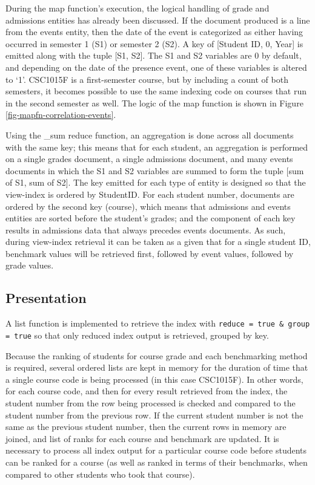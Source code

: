 During the map function’s execution, the logical handling of grade and admissions entities has already been discussed. If the document produced is a line from the events entity, then the date of the event is categorized as either having occurred in semester 1 (S1) or semester 2 (S2). A key of [Student ID, 0, Year] is emitted along with the tuple [S1, S2]. The S1 and S2 variables are 0 by default, and depending on the date of the presence event, one of these variables is altered to `1'. CSC1015F is a first-semester course, but by including a count of both semesters, it becomes possible to use the same indexing code on courses that run in the second semester as well. The logic of the map function is shown in Figure \ref{fig-mapfn-correlation-events}.

Using the \_sum reduce function, an aggregation is done across all documents with the same key; this means that for each student, an aggregation is performed on a single grades document, a single admissions document, and many events documents in which the S1 and S2 variables are summed to form the tuple [sum of S1, sum of S2]. The key emitted for each type of entity is designed so that the view-index is ordered by StudentID. For each student number, documents are ordered by the second key (course), which means that admissions and events entities are sorted before the student’s grades; and the  component of each key results in admissions data that always precedes events documents. As such, during view-index retrieval it can be taken as a given that for a single student ID, benchmark values will be retrieved first, followed by event values, followed by grade values.



\subsection{Presentation}
A list function is implemented to retrieve the index with \texttt{reduce = true \& group = true} so that only reduced index output is retrieved, grouped by key.

Because the ranking of students for course grade and each benchmarking method is required, several ordered lists are kept in memory for the duration of time that a single course code is being processed (in this case CSC1015F). In other words, for each course code, and then for every result retrieved from the index, the student number from the row being processed is checked and compared to the student number from the previous row. If the current student number is not the same as the previous student number, then the current rows in memory are joined, and list of ranks for each course and benchmark are updated. It is necessary to process all index output for a particular course code before students can be ranked for a course (as well as ranked in terms of their benchmarks, when compared to other students who took that course).

